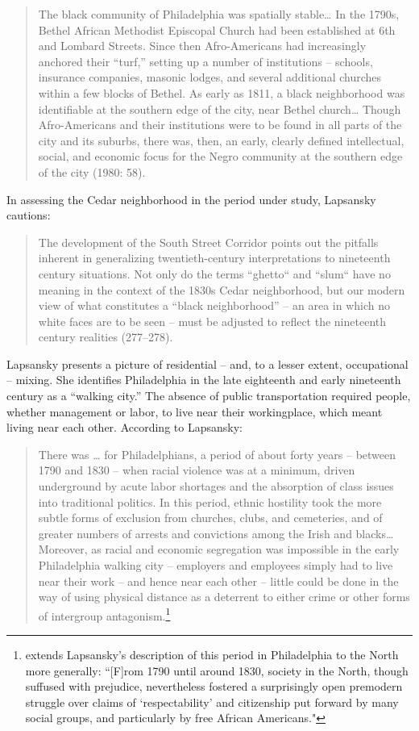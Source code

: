 \documentclass[output=paper,colorlinks,citecolor=brown]{langscibook}
\begin{document}
\begin{quote}
The black community of Philadelphia was spatially stable… In the 1790s, Bethel African Methodist Episcopal Church had been established at 6th and Lombard Streets. Since then Afro-Americans had increasingly anchored their “turf,” setting up a number of institutions -- schools, insurance companies, masonic lodges, and several additional churches within a few blocks of Bethel. As early as 1811, a black neighborhood was identifiable at the southern edge of the city, near Bethel church… Though Afro-Americans and their institutions were to be found in all parts of the city and its suburbs, there was, then, an early, clearly defined intellectual, social, and economic focus for the Negro community at the southern edge of the city (1980: 58).
\end{quote}

In assessing the Cedar neighborhood in the period under study, Lapsansky cautions:

\begin{quote}
The development of the South Street Corridor points out the pitfalls inherent in generalizing twentieth-century interpretations to nineteenth century situations. Not only do the terms “ghetto“ and “slum“ have no meaning in the context of the 1830s Cedar neighborhood, but our modern view of what constitutes a “black neighborhood” -- an area in which no white faces are to be seen -- must be adjusted to reflect the nineteenth century realities (277–278).
\end{quote}

Lapsansky presents a picture of residential -- and, to a lesser extent, occupational -- mixing. She identifies Philadelphia in the late eighteenth and early nineteenth century as a “walking city.” The absence of public transportation required people, whether management or labor, to live near their workingplace, which meant living near each other. According to Lapsansky:

\begin{quote}
There was … for Philadelphians, a period of about forty years -- between 1790 and 1830 -- when racial violence was at a minimum, driven underground by acute labor shortages and the absorption of class issues into traditional politics. In this period, ethnic hostility took the more subtle forms of exclusion from churches, clubs, and cemeteries, and of greater numbers of arrests and convictions among the Irish and blacks… Moreover, as racial and economic segregation was impossible in the early Philadelphia walking city – employers and employees simply had to live near their work -- and hence near each other -- little could be done in the way of using physical distance as a deterrent to either crime or other forms of intergroup antagonism.\footnote{\citet[692]{Stewart1999} extends Lapsansky’s description of this period in Philadelphia to the North more generally: “[F]rom 1790 until around 1830, society in the North, though suffused with prejudice, nevertheless fostered a surprisingly open premodern struggle over claims of ‘respectability’ and citizenship put forward by many social groups, and particularly by free African Americans."}
\end{quote}
\end{document}
